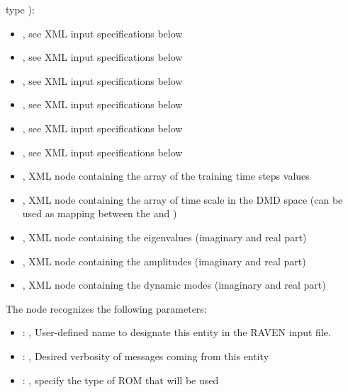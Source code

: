   type ):         \begin{itemize}           \item {}, see XML input
  specifications below           \item {}, see XML input specifications below
  \item {}, see XML input specifications below           \item {},
  see XML input specifications below           \item {}, see XML input
  specifications below           \item {}, see XML input specifications below
  \item {}, XML node containing the array of the training time steps values
  \item {}, XML node containing the array of time scale in the DMD space (can be
  used as mapping           between the   and )
  \item {}, XML node containing the eigenvalues (imaginary and real part)
  \item {}, XML node containing the amplitudes (imaginary and real part)
  \item {}, XML node containing the dynamic modes (imaginary and real part)
  \end{itemize}

  The  node recognizes the following parameters:
    \begin{itemize}
      \item {}: , 
        User-defined name to designate this entity in the RAVEN input file.
      \item {}: , 
        Desired verbosity of messages coming from this entity
      \item {}: , 
        specify the type of ROM that will be used
  \end{itemize}

